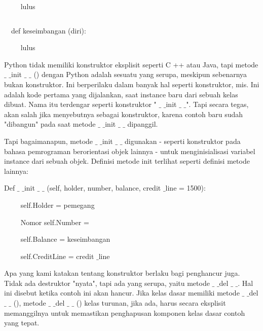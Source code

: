 \documentclass[a4paper,12pt]{report}
\begin{document}
\noindent 
{\fontsize{10pt}{10pt}\selectfont  $  $ $  $ $  $ $  $ $  $ $  $ $  $ $  $lulus} \par
\noindent 
{\fontsize{10pt}{10pt}\selectfont  $  $} \par
\noindent 
{\fontsize{10pt}{10pt}\selectfont  $  $ $  $ $  $ $  $def keseimbangan (diri):} \par
\noindent 
{\fontsize{10pt}{10pt}\selectfont  $  $ $  $ $  $ $  $ $  $ $  $ $  $ $  $lulus} \par
\noindent 
\vspace{10pt}
\noindent 
Python tidak memiliki konstruktor eksplisit seperti C ++ atau Java, tapi metode  $  \_  $ $  \_  $init  $  \_  $ $  \_  $ () dengan Python adalah sesuatu yang serupa, meskipun sebenarnya bukan konstruktor. Ini berperilaku dalam banyak hal seperti konstruktor, mis. Ini adalah kode pertama yang dijalankan, saat instance baru dari sebuah kelas dibuat. Nama itu terdengar seperti konstruktor " $  \_  $ $  \_  $init $  \_  $ $  \_  $". Tapi secara tegas, akan salah jika menyebutnya sebagai konstruktor, karena contoh baru sudah "dibangun" pada saat metode  $  \_  $ $  \_  $init $  \_  $ $  \_  $ dipanggil. \par
\noindent 
Tapi bagaimanapun, metode  $  \_  $ $  \_  $init $  \_  $ $  \_  $ digunakan - seperti konstruktor pada bahasa pemrograman berorientasi objek lainnya - untuk menginisialisasi variabel instance dari sebuah objek. Definisi metode init terlihat seperti definisi metode lainnya: \par
\noindent 
\vspace{10pt}
\noindent 
{\fontsize{10pt}{10pt}\selectfont Def  $  \_  $ $  \_  $init  $  \_  $ $  \_  $ (self, holder, number, balance, credit $  \_  $line = 1500):} \par
\noindent 
{\fontsize{10pt}{10pt}\selectfont  $  $ $  $ $  $ $  $ $  $ $  $ $  $ $  $self.Holder = pemegang} \par
\noindent 
{\fontsize{10pt}{10pt}\selectfont  $  $ $  $ $  $ $  $ $  $ $  $ $  $ $  $Nomor self.Number =} \par
\noindent 
{\fontsize{10pt}{10pt}\selectfont  $  $ $  $ $  $ $  $ $  $ $  $ $  $ $  $self.Balance = keseimbangan} \par
\noindent 
{\fontsize{10pt}{10pt}\selectfont  $  $ $  $ $  $ $  $ $  $ $  $ $  $ $  $self.CreditLine = credit $  \_  $line} \par
\noindent 
\vspace{10pt}
\noindent 
Apa yang kami katakan tentang konstruktor berlaku bagi penghancur juga. Tidak ada destruktor "nyata", tapi ada yang serupa, yaitu metode  $  \_  $ $  \_  $del $  \_  $ $  \_  $. Hal ini disebut ketika contoh ini akan hancur. Jika kelas dasar memiliki metode  $  \_  $ $  \_  $del  $  \_  $ $  \_  $ (), metode  $  \_  $ $  \_  $del  $  \_  $ $  \_  $ () kelas turunan, jika ada, harus secara eksplisit memanggilnya untuk memastikan penghapusan komponen kelas dasar contoh yang tepat. \par
\end{document}
